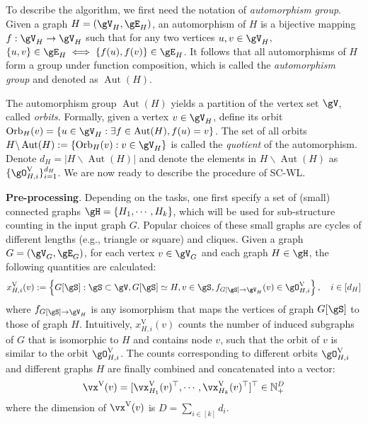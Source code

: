 \documentclass{article} %
\begin{document}
To describe the algorithm, we first need the notation of \emph{automorphism group}. Given a graph $H=(\gV_H,\gE_H)$, an automorphism of $H$ is a bijective mapping $f:\gV_H\to\gV_H$ such that for any two vertices $u,v\in\gV_H$, $\{u,v\}\in\gE_H\iff \{f(u),f(v)\}\in\gE_H$. It follows that all automorphisms of $H$ form a group under function composition, which is called the \emph{automorphism group} and denoted as $\operatorname{Aut}(H)$.

The automorphism group $\operatorname{Aut}(H)$ yields a partition of the vertex set $\gV$, called \emph{orbits}. Formally, given a vertex $v\in\gV_H$, define its orbit $\operatorname{Orb}_H(v)=\{u\in\gV_H:\exists f\in\operatorname{Aut}(H), f(u)=v\}$. The set of all orbits $H \backslash \operatorname{Aut}(H) := \{\operatorname{Orb}_H(v):v\in\gV_H\}$ is called the \emph{quotient} of the automorphism. Denote $d_H=|H \backslash \operatorname{Aut}(H)|$ and denote the elements in $H \backslash \operatorname{Aut}(H)$ as $\{\gO_{H,i}^\mathrm{V}\}_{i=1}^{d_H}$. We are now ready to describe the procedure of SC-WL.

\textbf{Pre-processing}. Depending on the tasks, one first specify a set of (small) connected graphs $\gH=\{H_1,\cdots,H_k\}$, which will be used for sub-structure counting in the input graph $G$. Popular choices of these small graphs are cycles of different lengths (e.g., triangle or square) and cliques. Given a graph $G=(\gV_G,\gE_G)$, for each vertex $v\in\gV_G$ and each graph $H\in\gH$, the following quantities are calculated:
\begin{equation}
\label{eq:scwl_1}
    x^\mathrm{V}_{H,i}(v):=\left\{G[\gS]:\gS\subset \gV,G[\gS]\simeq H,v\in\gS,f_{G[\gS]\to\gV_H}(v)\in\gO^\mathrm{V}_{H,i}\right\},\quad i\in[d_H]
\end{equation}
where $f_{G[\gS]\to \gV_H}$ is any isomorphism that maps the vertices of graph $G[\gS]$ to those of graph $H$. Intuitively, $x^\mathrm{V}_{H,i}(v)$ counts the number of induced subgraphs of $G$ that is isomorphic to $H$ and contains node $v$, such that the orbit of $v$ is similar to the orbit $\gO^\mathrm{V}_{H,i}$. The counts corresponding to different orbits $\gO^\mathrm{V}_{H,i}$ and different graphs $H$ are finally combined and concatenated into a vector:
\begin{equation}
\label{eq:scwl_2}
    \vx^\mathrm{V}(v)=[\vx^\mathrm{V}_{H_1}(v)^\top,\cdots,\vx^\mathrm{V}_{H_k}(v)^\top]^\top\in\mathbb N_+^{D}
\end{equation}
where the dimension of $\vx^\mathrm{V}(v)$ is $D=\sum_{i\in [k]}d_i$.
\end{document}
